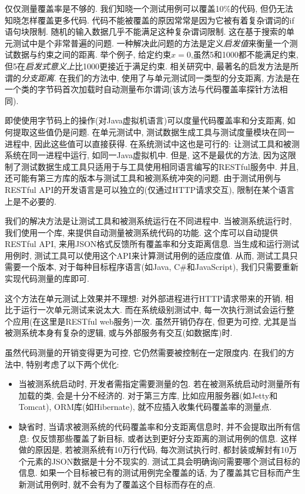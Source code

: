     仅仅测量覆盖率是不够的. 我们知晓一个测试用例可以覆盖10\%的代码, 但仍无法知晓怎样覆盖更多代码. 代码不能被覆盖的原因常常是因为它被有着复杂谓词的if语句块限制. 随机的输入数据几乎不能满足这种复杂谓词限制. 这在基于搜索的单元测试中是个非常普遍的问题. 一种解决此问题的方法是定义\textit{启发值}来衡量一个测试数据与约束之间的距离. 举个例子, 给定约束$x=0$,虽然5和1000都不能满足约束, 但5在\textit{启发式意义上}比1000更接近于满足约束. 相关研究中, 最著名的启发方法是所谓的\textit{分支距离}. 在我们的方法中, 使用了与单元测试同一类型的分支距离, 方法是在一个类的字节码首次加载时自动测量布尔谓词(该方法与代码覆盖率探针方法相同). 
    
    即使使用字节码上的操作(对Java虚拟机语言)可以度量代码覆盖率和分支距离, 如何提取这些值仍是问题. 在单元测试中, 测试数据生成工具与测试度量模块在同一进程中, 因此这些值可以直接获得. 在系统测试中这也是可行的: 让测试工具和被测系统在同一进程中运行, 如同一Java虚拟机中. 但是, 这不是最优的方法, 因为这限制了测试数据生成工具只适用于与工具使用相同语言编写的RESTful服务中. 并且, 还可能有第三方库的版本与测试工具和被测系统冲突的问题. 由于测试用例与RESTful API的开发语言是可以独立的(仅通过HTTP请求交互), 限制在某个语言上是不必要的. 
    
    我们的解决方法是让测试工具和被测系统运行在不同进程中. 当被测系统运行时, 我们使用一个库, 来提供自动测量被测系统代码的功能. 这个库可以自动提供RESTful API, 来用JSON格式反馈所有覆盖率和分支距离信息. 当生成和运行测试用例时, 测试工具可以使用这个API来计算测试用例的适应度值. 从而, 测试工具只需要一个版本, 对于每种目标程序语言(如Java, C\#和JavaScript), 我们只需要重新实现代码测量的库即可. 
    
    这个方法在单元测试上效果并不理想: 对外部进程进行HTTP请求带来的开销, 相比于运行一次单元测试来说太大. 而在系统级别测试中, 每一次执行测试会运行整个应用(在这里是RESTful web服务)一次. 虽然开销仍存在, 但更为可控, 尤其是当被测系统本身有复杂的逻辑, 或与外部服务有交互(如数据库)时. 
    
    虽然代码测量的开销变得更为可控, 它仍然需要被控制在一定限度内. 在我们的方法中, 特别考虑了以下两个优化: 
    
    \begin{itemize}
      \item 当被测系统启动时, 开发者需指定需要测量的包. 若在被测系统启动时测量所有加载的类, 会是十分不经济的. 对于第三方库, 比如应用服务器(如Jetty和Tomcat), ORM库(如Hibernate), 就不应插入收集代码覆盖率的测量点. 
        
        \item 缺省时, 当请求被测系统的代码覆盖率和分支距离信息时, 并不会提取出所有信息: 仅反馈那些覆盖了新目标, 或者达到更好分支距离的测试用例的信息. 这样做的原因是, 若被测系统有10万行代码, 每次测试执行时, 都封装或解封有10万个元素的JSON数据是十分不现实的. 测试工具会明确询问需要哪个测试目标的信息. 如果一个目标被已有的测试用例完全覆盖的话, 为了覆盖其它目标而产生新测试用例时, 就不会有为了覆盖这个目标而存在的点. 
    \end{itemize}
    
